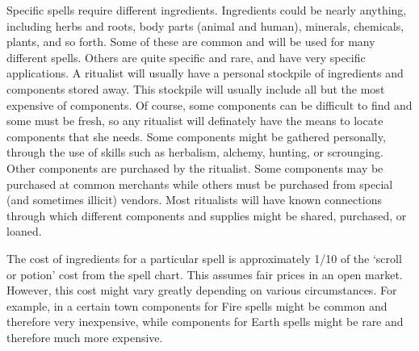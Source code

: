 \documentclass[twoside]{book}
\begin{document}
    {  
      Specific spells require different ingredients.
               Ingredients could be nearly anything, including herbs and
               roots, body parts (animal and human), minerals, chemicals,
               plants, and so forth. Some of these are common and will be
               used for many different spells. Others are quite specific
               and rare, and have very specific applications. A ritualist
               will usually have a personal stockpile of ingredients and
               components stored away. This stockpile will usually
               include all but the most expensive of components. Of
               course, some components can be difficult to find and some
               must be fresh, so any ritualist will definately have the
               means to locate components that she needs. Some components
               might be gathered personally, through the use of skills
               such as herbalism, alchemy, hunting, or scrounging. Other
               components are purchased by the ritualist. Some components
               may be purchased at common merchants while others must be
               purchased from special (and sometimes illicit) vendors.
               Most ritualists will have known connections through which
               different components and supplies might be shared,
               purchased, or loaned. 
    }
  
    {  
      The cost of ingredients for a particular spell is
               approximately 1/10 of the `scroll or potion'
               cost from the spell chart. This assumes fair prices in an
               open market. However, this cost might vary greatly
               depending on various circumstances. For example, in a
               certain town components for Fire spells might be common
               and therefore very inexpensive, while components for Earth
               spells might be rare and therefore much more expensive.
               
    }
  
\end{document}
